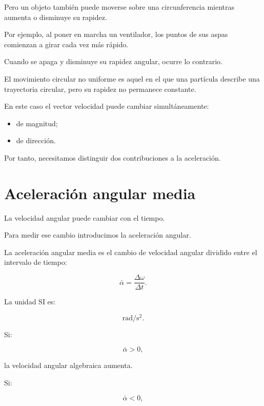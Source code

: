 Pero un objeto también puede moverse sobre una circunferencia mientras
aumenta o disminuye su rapidez.

Por ejemplo, al poner en marcha un ventilador, los puntos de sus aspas
comienzan a girar cada vez más rápido.

Cuando se apaga y disminuye su rapidez angular, ocurre lo contrario.

\begin{definicion}

El movimiento circular no uniforme es aquel en el que una partícula describe
una trayectoria circular, pero su rapidez no permanece constante.

\end{definicion}

En este caso el vector velocidad puede cambiar simultáneamente:

\begin{itemize}
    \item de magnitud;
    \item de dirección.
\end{itemize}

Por tanto, necesitamos distinguir dos contribuciones a la aceleración.


\section{Aceleración angular media}

La velocidad angular puede cambiar con el tiempo.

Para medir ese cambio introducimos la aceleración angular.

\begin{definicion}

La aceleración angular media es el cambio de velocidad angular dividido entre
el intervalo de tiempo:

\[
\boxed{
\bar{\alpha}
=
\frac{\Delta\omega}{\Delta t}
}.
\]

\end{definicion}

La unidad SI es:

\[
\si{\radian\per\second\squared}.
\]

Si:

\[
\bar{\alpha}>0,
\]

la velocidad angular algebraica aumenta.

Si:

\[
\bar{\alpha}<0,
\]

